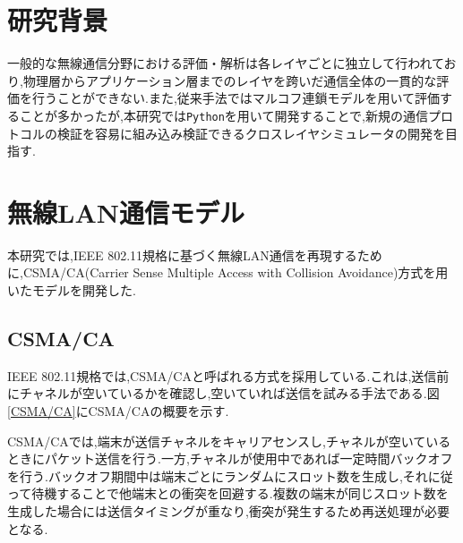 \documentclass[a4paper, 10pt]{ltjsarticle}
\begin{document}
\section{研究背景}
一般的な無線通信分野における評価・解析は各レイヤごとに独立して行われており,物理層からアプリケーション層までのレイヤを跨いだ通信全体の一貫的な評価を行うことができない.また,従来手法ではマルコフ連鎖モデルを用いて評価することが多かったが,本研究では\texttt{Python}を用いて開発することで,新規の通信プロトコルの検証を容易に組み込み検証できるクロスレイヤシミュレータの開発を目指す.



\section{無線LAN通信モデル}

本研究では,IEEE 802.11規格に基づく無線LAN通信を再現するために,CSMA/CA(Carrier Sense Multiple Access with Collision Avoidance)方式を用いたモデルを開発した.

\subsection{CSMA/CA}

IEEE 802.11規格では,CSMA/CAと呼ばれる方式を採用している.これは,送信前にチャネルが空いているかを確認し,空いていれば送信を試みる手法である.図\ref{CSMA/CA}にCSMA/CAの概要を示す.

CSMA/CAでは,端末が送信チャネルをキャリアセンスし,チャネルが空いているときにパケット送信を行う.一方,チャネルが使用中であれば一定時間バックオフを行う.バックオフ期間中は端末ごとにランダムにスロット数を生成し,それに従って待機することで他端末との衝突を回避する.複数の端末が同じスロット数を生成した場合には送信タイミングが重なり,衝突が発生するため再送処理が必要となる.
\end{document}
